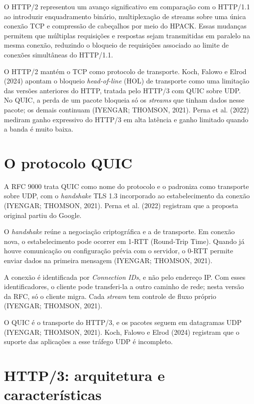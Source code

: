 O HTTP/2 representou um avanço significativo em comparação com o HTTP/1.1 ao introduzir enquadramento binário, multiplexação de streams sobre uma única conexão TCP e compressão de cabeçalhos por meio do HPACK. Essas mudanças permitem que múltiplas requisições e respostas sejam transmitidas em paralelo na mesma conexão, reduzindo o bloqueio de requisições associado ao limite de conexões simultâneas do HTTP/1.1.

O HTTP/2 mantém o TCP como protocolo de transporte. Koch, Falowo e Elrod (2024) apontam o bloqueio \textit{head-of-line} (HOL) de transporte como uma limitação das versões anteriores do HTTP, tratada pelo HTTP/3 com QUIC sobre UDP. No QUIC, a perda de um pacote bloqueia só os \textit{streams} que tinham dados nesse pacote; os demais continuam (IYENGAR; THOMSON, 2021). Perna et al. (2022) mediram ganho expressivo do HTTP/3 em alta latência e ganho limitado quando a banda é muito baixa.

\section{O protocolo QUIC}

A RFC 9000 trata QUIC como nome do protocolo e o padroniza como transporte sobre UDP, com o \textit{handshake} TLS 1.3 incorporado ao estabelecimento da conexão (IYENGAR; THOMSON, 2021). Perna et al. (2022) registram que a proposta original partiu do Google.

O \textit{handshake} reúne a negociação criptográfica e a de transporte. Em conexão nova, o estabelecimento pode ocorrer em 1-RTT (Round-Trip Time). Quando já houve comunicação ou configuração prévia com o servidor, o 0-RTT permite enviar dados na primeira mensagem (IYENGAR; THOMSON, 2021).

A conexão é identificada por \textit{Connection IDs}, e não pelo endereço IP. Com esses identificadores, o cliente pode transferi-la a outro caminho de rede; nesta versão da RFC, só o cliente migra. Cada \textit{stream} tem controle de fluxo próprio (IYENGAR; THOMSON, 2021).

O QUIC é o transporte do HTTP/3, e os pacotes seguem em datagramas UDP (IYENGAR; THOMSON, 2021). Koch, Falowo e Elrod (2024) registram que o suporte das aplicações a esse tráfego UDP é incompleto.

\section{HTTP/3: arquitetura e características}

